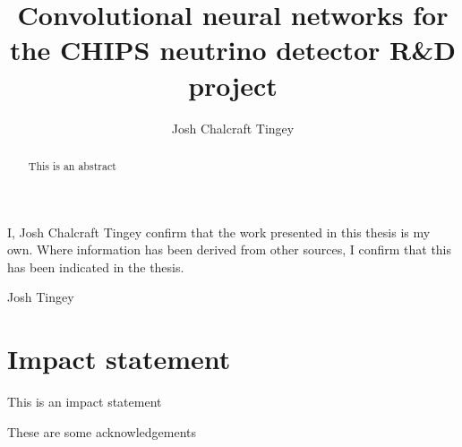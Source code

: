 
\title{Convolutional neural networks for the CHIPS neutrino detector R\&D project}
\author{Josh Chalcraft Tingey}

\thispagestyle{plain}

\begin{declaration} %
    I, Josh Chalcraft Tingey confirm that the work presented in this thesis is my own. Where
    information has been derived from other sources, I confirm that this has been indicated in the
    thesis.
    \vspace*{1cm}
    \begin{flushright}
        Josh Tingey
    \end{flushright}
\end{declaration}

\begin{abstract} %
    This is an abstract
\end{abstract}

\chapter*{\centering Impact statement}
This is an impact statement

\begin{acknowledgements} %
    These are some acknowledgements
\end{acknowledgements}

\tableofcontents %
\listoffigures %
\listoftables %